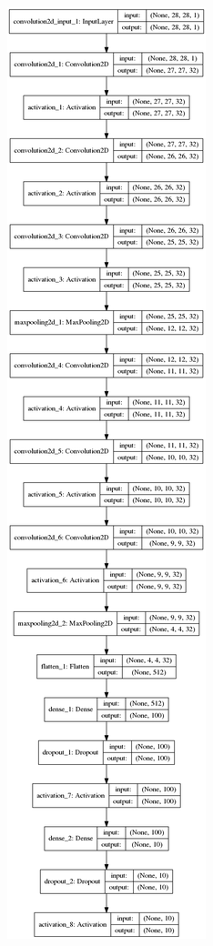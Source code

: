 \documentclass[tikz,11pt]{beamer}
\begin{document}
\begin{frame}
\begin{figure}
\begin{minipage}{.34\textwidth}
	\includegraphics[width=.4\linewidth, height=.9\textheight]{images/resultados/network_2/model}
	\end{minipage}

\end{figure}

\end{frame}
\end{document}
